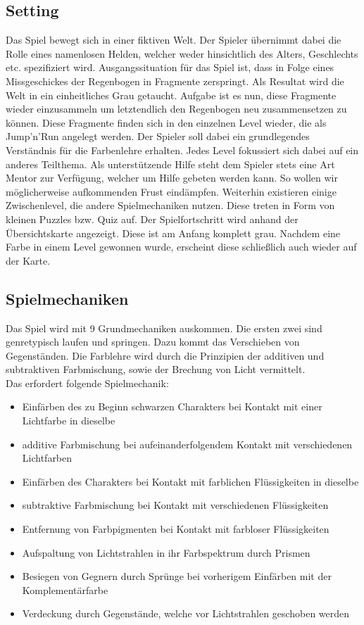 \documentclass[10pt,a4paper,notitlepage]{report}
\begin{document}
	\subsection{Setting}
		Das Spiel bewegt sich in einer fiktiven Welt. Der Spieler übernimmt dabei die
	Rolle eines namenlosen Helden, welcher weder hinsichtlich des Alters, Geschlechts
	etc. spezifiziert wird.
	Ausgangssituation für das Spiel ist, dass in Folge eines Missgeschickes der Regenbogen
	in Fragmente zerspringt. Als Resultat wird die Welt in ein einheitliches
	Grau getaucht.
	Aufgabe ist es nun, diese Fragmente wieder einzusammeln um letztendlich den
	Regenbogen neu zusammensetzen zu können. Diese Fragmente finden sich in den
	einzelnen Level wieder, die als Jump'n'Run angelegt werden.
	Der Spieler soll dabei ein grundlegendes Verständnis für die Farbenlehre erhalten.
	Jedes Level fokussiert sich dabei auf ein anderes Teilthema.
	Als unterstützende Hilfe steht dem Spieler stets eine Art Mentor zur Verfügung, welcher um Hilfe gebeten
	werden kann. So wollen wir möglicherweise aufkommenden Frust eindämpfen.
	Weiterhin existieren einige Zwischenlevel, die andere Spielmechaniken nutzen. Diese treten in Form von kleinen
	Puzzles bzw. Quiz auf.
	Der Spielfortschritt wird anhand der Übersichtskarte angezeigt. Diese ist am Anfang komplett grau. Nachdem eine
	Farbe in einem Level gewonnen wurde, erscheint diese schließlich auch wieder auf der Karte.

	\subsection{Spielmechaniken}
	Das Spiel wird mit 9 Grundmechaniken auskommen. Die ersten zwei sind genretypisch laufen und
	springen. Dazu kommt das Verschieben von Gegenständen. Die Farblehre wird durch die Prinzipien
	der additiven und subtraktiven Farbmischung, sowie der Brechung von Licht vermittelt.\\
	Das erfordert folgende Spielmechanik:
	\begin{itemize}
	\item Einfärben des zu Beginn schwarzen Charakters bei Kontakt mit einer Lichtfarbe in dieselbe
	\item additive Farbmischung bei aufeinanderfolgendem Kontakt mit verschiedenen Lichtfarben
	\item Einfärben des Charakters bei Kontakt mit farblichen Flüssigkeiten in dieselbe
	\item subtraktive Farbmischung bei Kontakt mit verschiedenen Flüssigkeiten
	\item Entfernung von Farbpigmenten bei Kontakt mit farbloser Flüssigkeiten
	\item Aufspaltung von Lichtstrahlen in ihr Farbspektrum durch Prismen
	\item Besiegen von Gegnern durch Sprünge bei vorherigem Einfärben mit der Komplementärfarbe
	\item Verdeckung durch Gegenstände, welche vor Lichtstrahlen geschoben werden
	\end{itemize}
\end{document}

